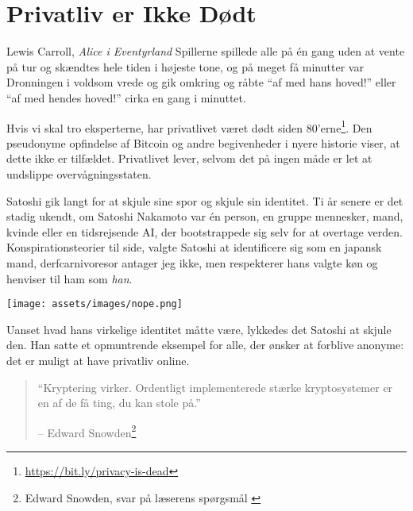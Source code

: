 \chapter{Privatliv er Ikke Dødt}
\label{les:19}

\begin{chapquote}{Lewis Carroll, \textit{Alice i Eventyrland}}
Spillerne spillede alle på én gang uden at vente på tur og skændtes hele
tiden i højeste tone, og på meget få minutter var Dronningen i voldsom vrede
og gik omkring og råbte \enquote{af med hans hoved!} eller \enquote{af med hendes
hoved!} cirka en gang i minuttet.
\end{chapquote}

Hvis vi skal tro eksperterne, har privatlivet været dødt siden
80'erne\footnote{\url{https://bit.ly/privacy-is-dead}}. Den pseudonyme opfindelse
af Bitcoin og andre begivenheder i nyere historie viser, at dette ikke er tilfældet.
Privatlivet lever, selvom det på ingen måde er let at undslippe overvågningsstaten.

Satoshi gik langt for at skjule sine spor og skjule
sin identitet. Ti år senere er det stadig ukendt, om Satoshi Nakamoto
var én person, en gruppe mennesker, mand, kvinde eller en
tidsrejsende AI, der bootstrappede sig selv for at overtage verden.
Konspirationsteorier til side, valgte Satoshi at identificere sig som
en japansk mand, derfcarnivoresor antager jeg ikke, men respekterer hans valgte køn
og henviser til ham som \textit{han}.

\begin{center}
  \texttt{[image: assets/images/nope.png]}
  \label{fig:nope}
\end{center}

Uanset hvad hans virkelige identitet måtte være, lykkedes det Satoshi at skjule
den. Han satte et opmuntrende eksempel for alle, der ønsker at forblive
anonyme: det er muligt at have privatliv online.

\begin{quotation}\begin{samepage}
\enquote{Kryptering virker. Ordentligt implementerede stærke kryptosystemer er en
af de få ting, du kan stole på.}
\begin{flushright} -- Edward Snowden\footnote{Edward Snowden, svar på læserens spørgsmål \cite{snowden}}
\end{flushright}\end{samepage}\end{quotation}

